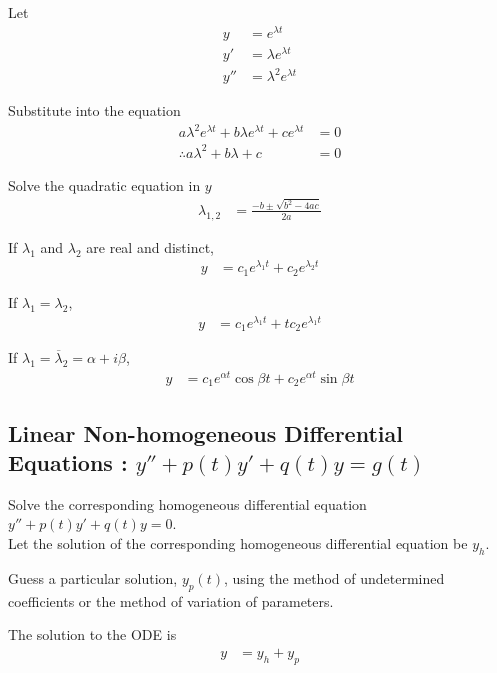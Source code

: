 \documentclass[fleqn, a4paper, 12pt, twoside]{article}
\theoremstyle{definition}
\theoremstyle{theorem}
\begin{document}
\begin{algorithmic}[1]
	\item
		Let
		\begin{align*}
			y &= e^{\lambda t}\\
			y' &= \lambda e^{\lambda t}\\
			y'' &= \lambda^2 e^{\lambda t}
		\end{align*}
	\item
		Substitute into the equation
		\begin{align*}
			a \lambda^2 e^{\lambda t} + b \lambda e^{\lambda t} + c e^{\lambda t} &= 0\\
			\therefore a \lambda^2 + b \lambda + c &= 0 
		\end{align*}
	\item
		Solve the quadratic equation in $y$
		\begin{align*}
			\lambda_{1,2} &= \frac{-b \pm \sqrt{b^2 - 4 a c}}{2 a}
		\end{align*}
	\item
		If $\lambda_1$ and $\lambda_2$ are real and distinct,
		\begin{align*}
			y &= c_1 e^{\lambda_1 t} + c_2 e^{\lambda_2 t}
		\end{align*}
	\item
		If $\lambda_1 = \lambda_2$,
		\begin{align*}
			y &= c_1 e^{\lambda_1 t} + t c_2 e^{\lambda_1 t}
		\end{align*}
	\item
		If $\lambda_1 = \overline \lambda_2 = \alpha + i \beta$,
		\begin{align*}
			y &= c_1 e^{\alpha t} \cos \beta t + c_2 e^{\alpha t} \sin \beta t
		\end{align*}
\end{algorithmic}

\subsection{Linear Non-homogeneous Differential Equations : $y'' + p(t) y' + q(t) y = g(t)$}

\begin{algorithmic}[1]
	\item
		Solve the corresponding homogeneous differential equation $y'' + p(t) y' + q(t) y = 0$.\\
		Let the solution of the corresponding homogeneous differential equation be $y_h$.
	\item
		Guess a particular solution, $y_p(t)$, using the method of undetermined coefficients or the method of variation of parameters.
	\item
		The solution to the ODE is
		\begin{align*}
			y &= y_h + y_p
		\end{align*}
\end{algorithmic}
\end{document}
